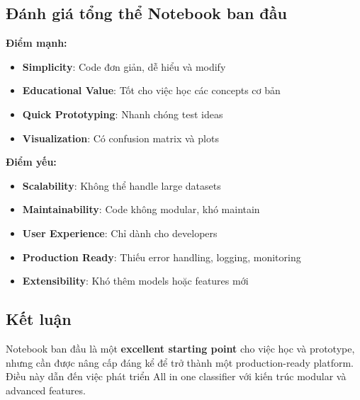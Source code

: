 \subsection{Đánh giá tổng thể Notebook ban đầu}

\textbf{Điểm mạnh:}
\begin{itemize}
    \item \textbf{Simplicity}: Code đơn giản, dễ hiểu và modify
    \item \textbf{Educational Value}: Tốt cho việc học các concepts cơ bản
    \item \textbf{Quick Prototyping}: Nhanh chóng test ideas
    \item \textbf{Visualization}: Có confusion matrix và plots
\end{itemize}

\textbf{Điểm yếu:}
\begin{itemize}
    \item \textbf{Scalability}: Không thể handle large datasets
    \item \textbf{Maintainability}: Code không modular, khó maintain
    \item \textbf{User Experience}: Chỉ dành cho developers
    \item \textbf{Production Ready}: Thiếu error handling, logging, monitoring
    \item \textbf{Extensibility}: Khó thêm models hoặc features mới
\end{itemize}

\subsection{Kết luận}

Notebook ban đầu là một \textbf{excellent starting point} cho việc học và prototype, nhưng cần được nâng cấp đáng kể để trở thành một production-ready platform. Điều này dẫn đến việc phát triển All in one classifier với kiến trúc modular và advanced features.
